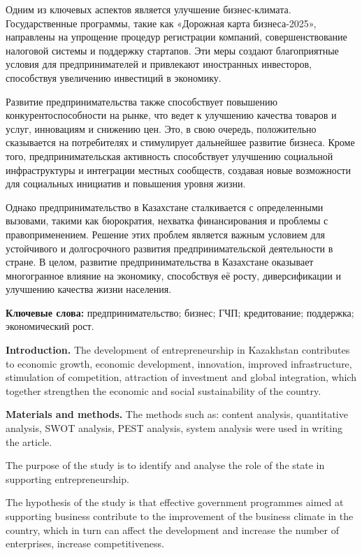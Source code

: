 Одним из ключевых аспектов является улучшение бизнес-климата.
Государственные программы, такие как «Дорожная карта бизнеса-2025»,
направлены на упрощение процедур регистрации компаний, совершенствование
налоговой системы и поддержку стартапов. Эти меры создают благоприятные
условия для предпринимателей и привлекают иностранных инвесторов,
способствуя увеличению инвестиций в экономику.

Развитие предпринимательства также способствует повышению
конкурентоспособности на рынке, что ведет к улучшению качества товаров и
услуг, инновациям и снижению цен. Это, в свою очередь, положительно
сказывается на потребителях и стимулирует дальнейшее развитие бизнеса.
Кроме того, предпринимательская активность способствует улучшению
социальной инфраструктуры и интеграции местных сообществ, создавая новые
возможности для социальных инициатив и повышения уровня жизни.

Однако предпринимательство в Казахстане сталкивается с определенными
вызовами, такими как бюрократия, нехватка финансирования и проблемы с
правоприменением. Решение этих проблем является важным условием для
устойчивого и долгосрочного развития предпринимательской деятельности в
стране. В целом, развитие предпринимательства в Казахстане оказывает
многогранное влияние на экономику, способствуя её росту, диверсификации
и улучшению качества жизни населения.

{\bfseries Ключевые слова:} предпринимательство; бизнес; ГЧП; кредитование;
поддержка; экономический рост.

{\bfseries Introduction.} The development of entrepreneurship in Kazakhstan
contributes to economic growth, economic development, innovation,
improved infrastructure, stimulation of competition, attraction of
investment and global integration, which together strengthen the
economic and social sustainability of the country.

{\bfseries Materials and methods.} The methods such as: content analysis,
quantitative analysis, SWOT analysis, PEST analysis, system analysis
were used in writing the article.

The purpose of the study is to identify and analyse the role of the
state in supporting entrepreneurship.

The hypothesis of the study is that effective government programmes
aimed at supporting business contribute to the improvement of the
business climate in the country, which in turn can affect the
development and increase the number of enterprises, increase
competitiveness.

